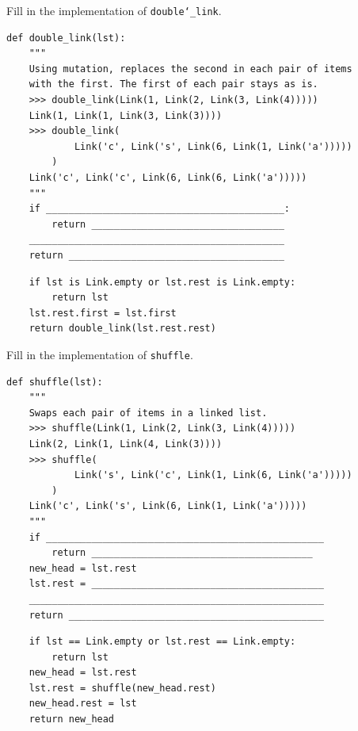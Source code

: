 \documentclass{exam}
\begin{document}
\begin{questions}
\begin{blocksection}
\question Fill in the implementation of \texttt{double\char`_link}.

\begin{lstlisting}
def double_link(lst):
    """
    Using mutation, replaces the second in each pair of items
    with the first. The first of each pair stays as is.
    >>> double_link(Link(1, Link(2, Link(3, Link(4)))))
    Link(1, Link(1, Link(3, Link(3))))
    >>> double_link(
            Link('c', Link('s', Link(6, Link(1, Link('a')))))
        )
    Link('c', Link('c', Link(6, Link(6, Link('a')))))
    """
    if __________________________________________:
        return __________________________________
    _____________________________________________
    return ______________________________________
\end{lstlisting}
\begin{solution}[0.5in]
\begin{lstlisting}
    if lst is Link.empty or lst.rest is Link.empty:
        return lst
    lst.rest.first = lst.first
    return double_link(lst.rest.rest)
\end{lstlisting}
\end{solution}
\end{blocksection}

\begin{blocksection}
\question Fill in the implementation of \texttt{shuffle}.

\begin{lstlisting}
def shuffle(lst):
    """
    Swaps each pair of items in a linked list.
    >>> shuffle(Link(1, Link(2, Link(3, Link(4)))))
    Link(2, Link(1, Link(4, Link(3))))
    >>> shuffle(
            Link('s', Link('c', Link(1, Link(6, Link('a')))))
        )
    Link('c', Link('s', Link(6, Link(1, Link('a')))))
    """
    if _________________________________________________
        return _______________________________________
    new_head = lst.rest
    lst.rest = _________________________________________
    ____________________________________________________
    return _____________________________________________
\end{lstlisting}

\begin{solution}[0.5in]
\begin{lstlisting}
    if lst == Link.empty or lst.rest == Link.empty:
        return lst
    new_head = lst.rest
    lst.rest = shuffle(new_head.rest)
    new_head.rest = lst
    return new_head
\end{lstlisting}
\end{solution}
\end{blocksection}


\end{questions}
\end{document}
